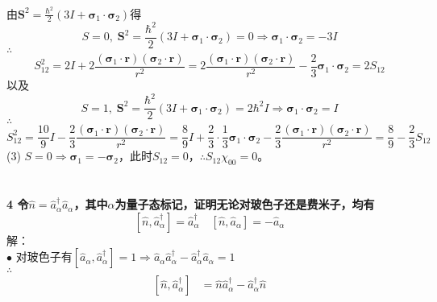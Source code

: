 \documentclass[12pt]{article}
\numberwithin{equation}{section}	 %
\begin{document}
\begin{spacing}{1.5}
\begin{align*}
\end{align*}
由$\displaystyle \bm{S}^{2} = \frac{\hbar^{2}}{2}\left(3I+\bm\sigma_{1}\cdot\bm\sigma_{2}\right)$得 \\
\begin{equation}
S=0,\; \bm{S}^{2} = \frac{\hbar^{2}}{2}\left(3I+\bm\sigma_{1}\cdot\bm\sigma_{2}\right) = 0 \Rightarrow \bm\sigma_{1}\cdot\bm\sigma_{2}=-3I
\end{equation}
$\therefore$ 
\begin{equation}\nonumber 		%
S_{12}^{2} = 2I + 2\frac{(\bm\sigma_{1}\cdot\bm{r})(\bm\sigma_{2}\cdot\bm{r})}{r^{2}} = 2\frac{(\bm\sigma_{1}\cdot\bm{r})(\bm\sigma_{2}\cdot\bm{r})}{r^{2}}-\frac{2}{3}\bm\sigma_{1}\cdot\bm\sigma_{2} = 2S_{12}
\end{equation}
以及
\begin{equation}
S=1,\; \bm{S}^{2} = \frac{\hbar^{2}}{2}\left(3I+\bm\sigma_{1}\cdot\bm\sigma_{2}\right) = 2\hbar^{2}I \Rightarrow \bm\sigma_{1}\cdot\bm\sigma_{2}=I
\end{equation}
$\therefore$ 
\begin{equation}\nonumber 		%
S_{12}^{2} = \frac{10}{9}I - \frac{2}{3}\frac{(\bm\sigma_{1}\cdot\bm{r})(\bm\sigma_{2}\cdot\bm{r})}{r^{2}} = \frac{8}{9}I + \frac{2}{3}\cdot\frac{1}{3}\bm\sigma_{1}\cdot\bm\sigma_{2} - \frac{2}{3}\frac{(\bm\sigma_{1}\cdot\bm{r})(\bm\sigma_{2}\cdot\bm{r})}{r^{2}} = \frac{8}{9}-\frac{2}{3}S_{12}
\end{equation}
(3) $S=0 \Rightarrow \bm\sigma_{1} = -\bm\sigma_{2}$，此时$S_{12}=0$，$\therefore S_{12}\chi_{00}=0$。\\
~\\
~\\
\textbf{4 \quad 令$\hat{n}=\hat{a}_{\alpha}^{\dag}\hat{a}_{\alpha}$，其中$\alpha$为量子态标记，证明无论对玻色子还是费米子，均有
\begin{equation}\nonumber 		%
\left[\hat{n},\hat{a}_{\alpha}^{\dag}\right]=\hat{a}_{\alpha}^{\dag} \quad \left[\hat{n},\hat{a}_{\alpha}\right]=-\hat{a}_{\alpha}
\end{equation}}
解：\\
$\bullet$ 对玻色子有$\left[\hat{a}_{\alpha},\hat{a}_{\alpha}^{\dag}\right]=1 \Rightarrow \hat{a}_{\alpha}\hat{a}_{\alpha}^{\dag}-\hat{a}_{\alpha}^{\dag}\hat{a}_{\alpha}=1$\\
$\therefore$
\begin{align*}
\left[\hat{n},\hat{a}_{\alpha}^{\dag}\right] &= \hat{n}\hat{a}_{\alpha}^{\dag} - \hat{a}_{\alpha}^{\dag}\hat{n} \\

\end{align*}
\end{spacing}
\end{document}
